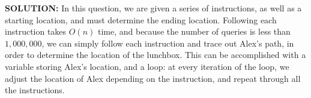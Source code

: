 \textbf{SOLUTION:}
\blank
In this question, we are given a series of instructions, as well as a starting location, and must determine the ending location.  Following each instruction takes $ O(n) $ time, and because the number of queries is less than $ 1,000,000 $, we can simply follow each instruction and trace out Alex's path, in order to determine the location of the lunchbox.  This can be accomplished with a variable storing Alex's location, and a loop: at every iteration of the loop, we adjust the location of Alex depending on the instruction, and repeat through all the instructions.